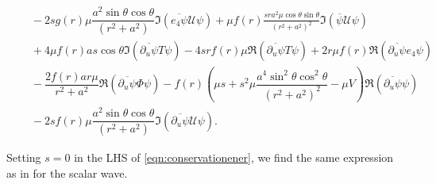 \documentclass[reqno]{amsart}
\numberwithin{equation}{section}
\theoremstyle{plain}
\theoremstyle{definition}
\theoremstyle{remark}
\numberwithin{equation}{section}
\begin{document}
\begin{lem}
\begin{align*}
    &\quad-2sg(r)\mu\dfrac{a^2\sin\theta\cos\theta}{(r^2+a^2)}\mathfrak{I}(\overline{e_4\psi}\mathcal{U}\psi)+\mu f(r)\frac{sra^2\mu\cos\theta\sin\theta}{(r^2+a^2)^2}\mathfrak{I}(\overline{\psi} \mathcal{U}\psi)\\
    &\quad+4\mu f(r)as\cos\theta\mathfrak{I}(\overline{\partial_u\psi}T\psi)-4srf(r)\mu\mathfrak{R}(\overline{\partial_u\psi}T\psi)+2r\mu f(r)\mathfrak{R}(\overline{\partial_u\psi}e_4\psi)\\
    &\quad-\dfrac{2f(r)ar\mu}{r^2+a^2}\mathfrak{R}(\overline{\partial_u\psi}\Phi\psi)-f(r)\left(\mu s+s^2\mu\dfrac{a^4\sin^2\theta\cos^2\theta}{(r^2+a^2)^2}-\mu V\right)\mathfrak{R}(\overline{\partial_u\psi}\psi)\\
    &\quad-2sf(r)\mu\dfrac{a^2\sin\theta\cos\theta}{(r^2+a^2)}\mathfrak{I}(\overline{\partial_u\psi}\mathcal{U}\psi).
\end{align*}
\end{lem}
\begin{rem}
    Setting $s=0$ in the LHS of \eqref{eqn:conservationener}, we find the same expression as in \cite[(3.5c)]{scalarMZ} for the scalar wave.
\end{rem}
\end{document}
